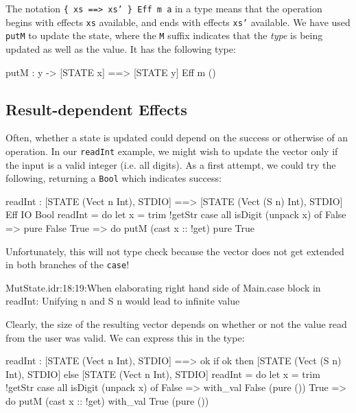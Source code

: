\noindent
The notation \texttt{\{ xs ==> xs' \} Eff m a} in a type means that the
operation begins with effects \texttt{xs} available, and ends with effects
\texttt{xs'} available. We have used \texttt{putM} to update the state, where
the \texttt{M} suffix indicates that the \emph{type} is being updated as well
as the value. It has the following type:

\begin{code}
putM : y -> { [STATE x] ==> [STATE y] } Eff m () 
\end{code}

\subsection{Result-dependent Effects}

Often, whether a state is updated could depend on the success or otherwise
of an operation. In our \texttt{readInt} example, we might wish to update
the vector only if the input is a valid integer (i.e. all digits). As a
first attempt, we could try the following, returning a \texttt{Bool} which
indicates success:

\begin{code}
readInt : { [STATE (Vect n Int), STDIO] ==>
            [STATE (Vect (S n) Int), STDIO] } Eff IO Bool
readInt = do let x = trim !getStr
             case all isDigit (unpack x) of
                  False => pure False
                  True => do putM (cast x :: !get)
                             pure True
\end{code}

\noindent
Unfortunately, this will not type check because the vector does not get
extended in both branches of the \texttt{case}!

\begin{code}
MutState.idr:18:19:When elaborating right hand side of Main.case 
block in readInt:
Unifying n and S n would lead to infinite value
\end{code}

\noindent
Clearly, the size of the resulting vector depends on whether or not the
value read from the user was valid. We can express this in the type:

\begin{code}
readInt : { [STATE (Vect n Int), STDIO] ==>
            {ok} if ok then [STATE (Vect (S n) Int), STDIO]
                       else [STATE (Vect n Int), STDIO] }
readInt = do let x = trim !getStr
             case all isDigit (unpack x) of
                  False => with_val False (pure ())
                  True => do putM (cast x :: !get)
                             with_val True (pure ())
\end{code}


